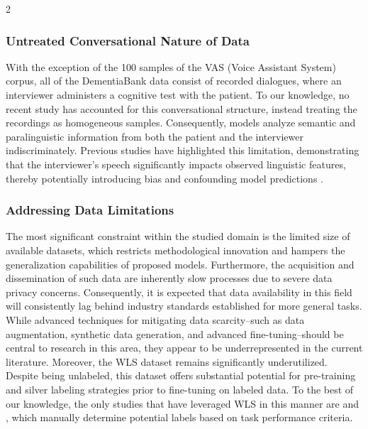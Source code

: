 \documentclass[10pt]{article}
\begin{document}
\begin{multicols}{2}
\subsubsection{Untreated Conversational Nature of Data}
\label{sec:conversational-nature} \par With the exception of the 100 samples of
the VAS (Voice Assistant System) corpus, all of the DementiaBank data consist
of recorded dialogues, where an interviewer administers a cognitive test with
the patient. To our knowledge, no recent study has accounted for this
conversational structure, instead treating the recordings as homogeneous
samples. Consequently, models analyze semantic and paralinguistic information
from both the patient and the interviewer indiscriminately. Previous studies
have highlighted this limitation, demonstrating that the interviewer's speech
significantly impacts observed linguistic features, thereby potentially
introducing bias and confounding model predictions
\cite{liThereAnythingElse2025}.

\subsubsection{Addressing Data Limitations} \par The most significant
constraint within the studied domain is the limited size of available datasets,
which restricts methodological innovation and hampers the generalization
capabilities of proposed models. Furthermore, the acquisition and dissemination
of such data are inherently slow processes due to severe data privacy concerns.
Consequently, it is expected that data availability in this field will
consistently lag behind industry standards established for more general tasks.
While advanced techniques for mitigating data scarcity--such as data
augmentation, synthetic data generation, and advanced fine-tuning--should be
central to research in this area, they appear to be underrepresented in the
current literature. Moreover, the WLS dataset remains significantly
underutilized. Despite being unlabeled, this dataset offers substantial
potential for pre-training and silver labeling strategies prior to fine-tuning
on labeled data. To the best of our knowledge, the only studies that have
leveraged WLS in this manner are
\cite{shakeriMultiConADUnifiedMultilingual2025} and
\cite{guoCrossingCookieTheft2021}, which manually determine potential labels
based on task performance criteria.


\printbibliography 

\end{multicols}
\end{document}
